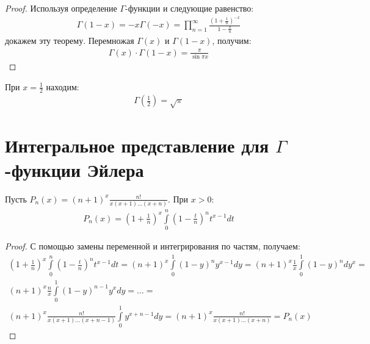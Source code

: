 \begin{proof}
  Используя определение $\Gamma$-функции и следующие равенство:
  \begin{gather*}
    \Gamma(1 - x) = -x \Gamma(-x) = \prod\limits_{n = 1}^\infty
    \frac{\left(1 + \frac{1}{n}\right)^{-x}}{1 - \frac{x}{n}}
  \end{gather*}
  докажем эту теорему. Перемножая $\Gamma(x)$ и $\Gamma(1 - x)$, получим:
  \begin{gather*}
    \Gamma(x) \cdot \Gamma(1 - x) = \frac{\pi}{\sin \pi x}
  \end{gather*}
\end{proof}

\begin{consequence}
  При $x = \frac{1}{2}$ находим:
  \begin{gather}
    \Gamma \left( \frac{1}{2} \right) = \sqrt{\pi}
  \end{gather}
\end{consequence}

\section{Интегральное представление для $\Gamma$-функции Эйлера}

\begin{lemma}
  Пусть $P_n(x) = (n + 1)^x \frac{n!}{x(x + 1)\dots(x + n)}$. При $x > 0$:
  \begin{gather*}
    P_n(x) = \left( 1 + \frac{1}{n} \right)^x \int\limits_0^n \left( 1 -
    \frac{t}{n} \right)^n t^{x - 1} dt
  \end{gather*}
\end{lemma}

\begin{proof}
  С помощью замены переменной и интегрирования по частям, получаем:
  \begin{gather*}
    \left( 1 + \frac{1}{n} \right)^x \int\limits_0^n \left( 1 -
    \frac{t}{n} \right)^n t^{x - 1} dt = (n + 1)^x \int\limits_0^1 (1 - y)^n
    y^{x - 1} dy = (n + 1)^x \frac{1}{x} \int\limits_0^1 (1 - y)^n dy^x = \\
    (n + 1)^x \frac{n}{x} \int\limits_0^1 (1 - y)^{n - 1}y^x dy = \dots = \\
    (n+1)^x \frac{n!}{x(x + 1)\dots(x + n -1)} \int\limits_0^1 y^{x + n - 1} dy
    = (n + 1)^x \frac{n!}{x(x + 1) \dots (x + n)} = P_n(x)
  \end{gather*}
\end{proof}

